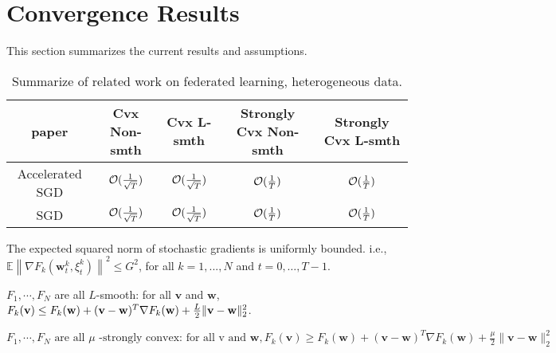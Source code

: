 


\section{Convergence Results}
This section summarizes the current results and assumptions.
\begin{table}[h!]
\centering
\small
	\begin{tabular}{|c|c|c|c|c|}\hline
		paper         &  Cvx Non-smth & Cvx L-smth & Strongly Cvx Non-smth& Strongly Cvx L-smth \\ \hline
	Accelerated	SGD   &   ${\mathcal{O}}(\frac{1}{\sqrt{T}})$     & ${\mathcal{O}}(\frac{1}{\sqrt{T}})$   &    ${\mathcal{O}}(\frac{1}{T})$   &  ${\mathcal{O}}(\frac{1}{T})$    \\\hline
	SGD    &    ${\mathcal{O}}(\frac{1}{\sqrt{T}})$  &   ${\mathcal{O}}(\frac{1}{\sqrt{T}})$  &  ${\mathcal{O}}(\frac{1}{T})$  & ${\mathcal{O}}(\frac{1}{T})$\cite{li2019convergence,haddadpour2019convergence}      \\\hline
	\end{tabular}
	\caption{Summarize of related work on federated learning, heterogeneous data.}
\end{table}





\begin{assumption}
The expected squared norm of stochastic gradients is uniformly bounded. i.e.,
$\mathbb{E}\left\|\nabla F_{k}\left(\mathbf{w}_{t}^{k}, \xi_{t}^{k}\right)\right\|^{2} \leq G^{2}$, for all $k = 1,..., N$ and $t=0, \dots, T-1$.
\label{ass:subgrad2}
\end{assumption}

\begin{assumption}[L-smooth]
$F_{1}, \cdots, F_{N}$ are all $L$-smooth: for all  $\mathbf{v}$  and $\mathbf{w}$, $F_{k}(\mathbf{v}) \leq F_{k}(\mathbf{w})+(\mathbf{v}- \\ \mathbf{w})^{T} \nabla F_{k}(\mathbf{w})+\frac{L}{2}\|\mathbf{v}-\mathbf{w}\|_{2}^{2}$.
\label{ass:lsmooth}
\end{assumption}
\begin{assumption}
$	F_{1}, \cdots, F_{N} \text { are all } \mu \text { -strongly convex: for all v and } \mathbf{w}, F_{k}(\mathbf{v}) \geq F_{k}(\mathbf{w})+(\mathbf{v}-\mathbf{w})^{T} \nabla F_{k}(\mathbf{w})+\frac{\mu}{2}\|\mathbf{v}-\mathbf{w}\|_{2}^{2}$
\label{ass:stroncvx}
\end{assumption}


